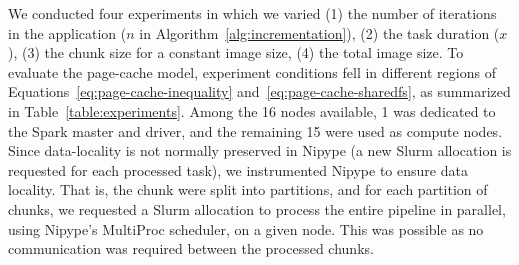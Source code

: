\documentclass{IEEEtran}
\begin{document}
We conducted four experiments in which we varied (1) the number of 
iterations in the application ($n$ in 
Algorithm~\ref{alg:incrementation}), (2) the task duration ($x$), (3) 
the chunk size for a constant image size, (4) the total image size. To 
evaluate the page-cache model, experiment conditions fell in different 
regions of Equations~\ref{eq:page-cache-inequality} 
and~\ref{eq:page-cache-sharedfs}, as summarized in 
Table~\ref{table:experiments}. Among the 16 nodes available, 1 was 
dedicated to the Spark master and driver, and the remaining 15 were 
used as compute nodes. Since data-locality is not normally preserved in 
Nipype (a new Slurm allocation is requested for each processed task), 
we instrumented Nipype to ensure data locality. That is, the chunk were split into partitions, and for each partition of 
chunks, we requested a Slurm allocation to process the entire 
pipeline in parallel, using Nipype's MultiProc scheduler, on a given 
node. This was possible as no communication was required between the 
processed chunks.
\end{document}
